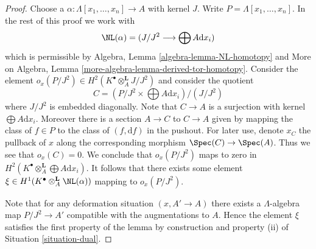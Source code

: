 \begin{proof}
Choose a $\alpha : \Lambda[x_1, \ldots, x_n] \to A$ with kernel $J$.
Write $P = \Lambda[x_1, \ldots, x_n]$. In the rest of this proof we work with
$$
\NL(\alpha) = (J/J^2 \longrightarrow \bigoplus A \text{d}x_i)
$$
which is permissible by
Algebra, Lemma \ref{algebra-lemma-NL-homotopy}
and
More on Algebra, Lemma \ref{more-algebra-lemma-derived-tor-homotopy}.
Consider the element
$o_x(P/J^2) \in H^2(K^\bullet \otimes_A^\mathbf{L} J/J^2)$ and consider
the quotient
$$
C = (P/J^2 \times \bigoplus A \text{d}x_i)/(J/J^2)
$$
where $J/J^2$ is embedded diagonally. Note that $C \to A$ is a surjection
with kernel $\bigoplus A\text{d}x_i$. Moreover there is a section
$A \to C$ to $C \to A$ given by mapping the class of $f \in P$ to the class
of $(f, \text{d}f)$ in the pushout. For later use, denote $x_C$ the
pullback of $x$ along the corresponding morphism $\Spec(C) \to \Spec(A)$.
Thus we see that $o_x(C) = 0$.
We conclude that $o_x(P/J^2)$ maps to zero in
$H^2(K^\bullet \otimes_A^\mathbf{L} \bigoplus A\text{d}x_i)$.
It follows that there exists some element
$\xi \in H^1(K^\bullet \otimes_A^\mathbf{L} \NL(\alpha))$
mapping to $o_x(P/J^2)$.

\medskip\noindent
Note that for any deformation situation $(x, A' \to A)$ there exists
a $\Lambda$-algebra map $P/J^2 \to A'$ compatible with the augmentations
to $A$. Hence the
element $\xi$ satisfies the first property of the lemma by construction
and property (ii) of Situation \ref{situation-dual}.


\end{proof}
